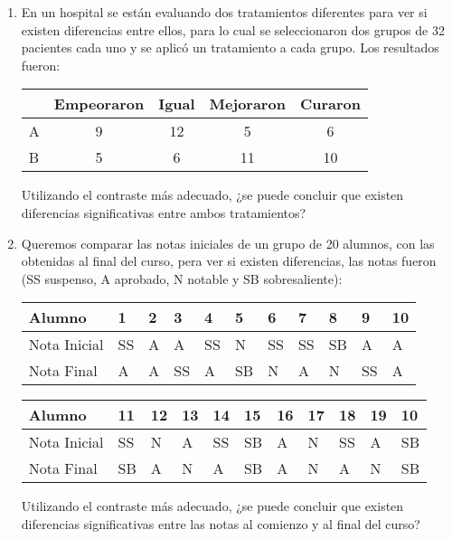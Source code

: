 \begin{enumerate}[leftmargin=*]
\item En un hospital se están evaluando dos tratamientos diferentes para ver si existen diferencias entre ellos, para lo
cual se seleccionaron dos grupos de 32 pacientes cada uno y se aplicó un tratamiento a cada grupo.
Los resultados fueron:
\begin{center}
\begin{tabular}{|l|c|c|c|c|}
\cline{2-5}
\multicolumn{1}{c|}{} & Empeoraron & Igual & Mejoraron & Curaron\\
\hline
A & 9 & 12 & 5 & 6 \\
\hline
B & 5 & 6 & 11 & 10 \\
\hline
\end{tabular}
\end{center}

Utilizando el contraste más adecuado, ¿se puede concluir que existen diferencias significativas entre ambos
tratamientos?


\item Queremos comparar las notas iniciales de un grupo de 20 alumnos, con las obtenidas al final del curso, pera ver si
existen diferencias, las notas fueron (SS suspenso, A aprobado, N notable y SB sobresaliente):
\begin{center}
\begin{tabular}{|l|l|l|l|l|l|l|l|l|l|l|}
\hline
 Alumno & 1 & 2 & 3 & 4 & 5 & 6 & 7 & 8 & 9 & 10 \\
\hline
Nota Inicial & SS & A & A & SS & N & SS & SS & SB & A & A  \\
\hline
Nota Final & A & A & SS & A & SB & N & A & N & SS & A  \\
\hline
\end{tabular}
\end{center}

\begin{center}
\begin{tabular}{|l|l|l|l|l|l|l|l|l|l|l|}
\hline
 Alumno & 11 & 12 & 13 & 14 & 15 & 16 & 17 & 18 & 19 & 10 \\
\hline
Nota Inicial & SS & N & A & SS & SB & A & N & SS & A & SB  \\
\hline
Nota Final & SB & A & N & A & SB & A & N & A & N & SB  \\
\hline
\end{tabular}
\end{center}

Utilizando el contraste más adecuado, ¿se puede concluir que existen diferencias significativas entre las notas al
comienzo y al final del curso?



\end{enumerate}
